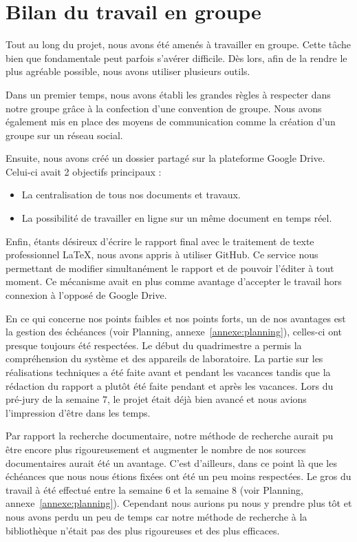 \section{Bilan du travail en groupe}

Tout au long du projet, nous avons été amenés à travailler en groupe. Cette tâche bien que fondamentale peut parfois s'avérer difficile. Dès lors, afin de la rendre le plus agréable possible, nous avons utiliser plusieurs outils.

Dans un premier temps, nous avons établi les grandes règles à respecter dans notre groupe grâce à la confection d'une convention de groupe. Nous avons également mis en place des moyens de communication comme la création d'un groupe sur un réseau social.

Ensuite, nous avons créé un dossier partagé sur la plateforme Google Drive. Celui-ci avait 2 objectifs principaux :
\begin{itemize}
\item La centralisation de tous nos documents et travaux.
\item La possibilité de travailler en ligne sur un même document en temps réel.
\end{itemize}

Enfin, étants désireux d'écrire le rapport final avec le traitement de texte professionnel \LaTeX, nous avons appris à utiliser GitHub. Ce service nous permettant de modifier simultanément le rapport et de pouvoir l'éditer à tout moment. Ce mécanisme avait en plus comme avantage d'accepter le travail hors connexion à l'opposé de Google Drive.

En ce qui concerne nos points faibles et nos points forts, un de nos avantages est la gestion des échéances (voir Planning, annexe~\ref{annexe:planning}), celles-ci ont presque toujours été respectées. Le début du quadrimestre a permis la compréhension du système et des appareils de laboratoire. La partie sur les réalisations techniques a été faite avant et pendant les vacances tandis que la rédaction du rapport a plutôt été faite pendant et après les vacances. Lors du pré-jury de la semaine 7, le projet était déjà bien avancé et nous avions l'impression d'être dans les temps.

Par rapport la recherche documentaire, notre méthode de recherche aurait pu être encore plus rigoureusement et augmenter le nombre de nos sources documentaires aurait été un avantage. C'est d'ailleurs, dans ce point là que les échéances que nous nous étions fixées ont été un peu moins respectées. Le gros du travail à été effectué entre la semaine 6 et la semaine 8 (voir Planning, annexe~\ref{annexe:planning}). Cependant nous aurions pu nous y prendre plus tôt et nous avons perdu un peu de temps car notre méthode de recherche à la bibliothèque n'était pas des plus rigoureuses et des plus efficaces.


